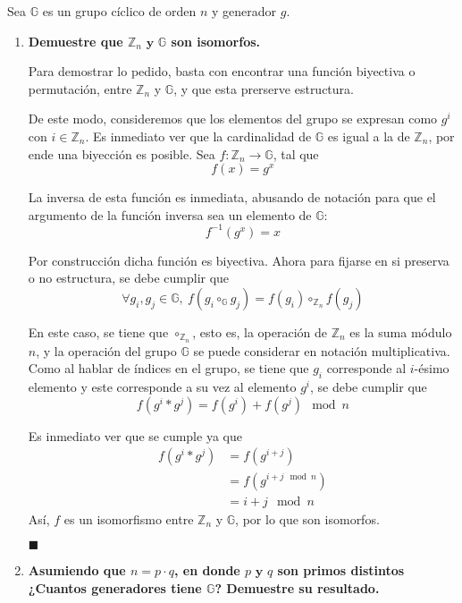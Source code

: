 \documentclass[twoside]{tareas}
\begin{document}
Sea $\mathbb{G}$ es un grupo cíclico de orden $n$ y generador $g$.

\begin{enumerate}
    \item \textbf{Demuestre que {\boldmath$\mathbb{Z}_n \textbf{ y } \mathbb{G}$} son isomorfos.}

    Para demostrar lo pedido, basta con encontrar una función biyectiva o permutación, entre $\mathbb{Z}_n$ y $\mathbb{G}$, y que esta prerserve estructura.

    De este modo, consideremos que los elementos del grupo se expresan como $g^i$ con $i \in \mathbb{Z}_n$. Es inmediato ver que la cardinalidad de $\mathbb{G}$ es igual a la de $\mathbb{Z}_n$, por ende una biyección es posible. Sea $f: \mathbb{Z}_n \rightarrow \mathbb{G}$, tal que
    $$f(x) = g^x$$

    La inversa de esta función es inmediata, abusando de notación para que el argumento de la función inversa sea un elemento de $\mathbb{G}$:
    $$f^{-1}(g^x) = x$$

    Por construcción dicha función es biyectiva. Ahora para fijarse en si preserva o no estructura, se debe cumplir que
    $$\forall g_i, g_j \in \mathbb{G}, \ f(g_i \circ_{\mathbb{G}} g_j) = f(g_i) \circ_{\mathbb{Z}_n} f(g_j)$$

    En este caso, se tiene que $\circ_{\mathbb{Z}_n}$, esto es, la operación de $\mathbb{Z}_n$ es la suma módulo $n$, y la operación del grupo $\mathbb{G}$ se puede considerar en notación multiplicativa. Como al hablar de índices en el grupo, se tiene que $g_i$ corresponde al $i$-ésimo elemento y este corresponde a su vez al elemento $g^i$, se debe cumplir que
    $$f(g^i * g^j) = f(g^i) + f(g^j) \mod n$$

    Es inmediato ver que se cumple ya que
    \begin{align*}
        f(g^i * g^j) &= f(g^{i + j})\\
        &=f(g^{i + j \mod n})\\
        &=i + j \mod n
    \end{align*}
    Así, $f$ es un isomorfismo entre $\mathbb{Z}_n$ y $\mathbb{G}$, por lo que son isomorfos. \begin{flushright} $\blacksquare$ \end{flushright}
    \pagebreak

    \item \textbf{Asumiendo que {\boldmath$n = p \cdot q$}, en donde {\boldmath$p \textbf{ y } q$} son primos distintos ¿Cuantos generadores tiene {\boldmath$\mathbb{G}$}? Demuestre su resultado.}


\end{enumerate}
\end{document}
